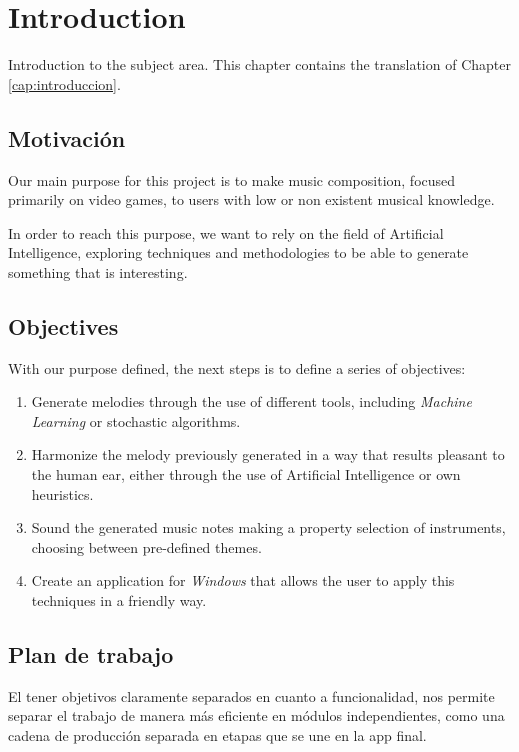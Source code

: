 \chapter*{Introduction}
\label{cap:introduction}

Introduction to the subject area. This chapter contains the translation of Chapter \ref{cap:introduccion}.

\section{Motivación}
Our main purpose for this project is to make music composition, focused primarily on video games, to users with low or non existent musical knowledge.

In order to reach this purpose, we want to rely on the field of Artificial Intelligence, exploring techniques and methodologies to be able to generate something that is interesting.

\section{Objectives}
With our purpose defined, the next steps is to define a series of objectives:
\begin{enumerate}
    \item Generate melodies through the use of different tools, including \textit{Machine Learning} or stochastic algorithms.
    \item Harmonize the melody previously generated in a way that results pleasant to the human ear, either through the use of Artificial Intelligence or own heuristics.
    \item Sound the generated music notes making a property selection of instruments, choosing between pre-defined themes. 
    \item Create an application for \textit{Windows} that allows the user to apply this techniques in a friendly way.
\end{enumerate}

\section{Plan de trabajo}
El tener objetivos claramente separados en cuanto a funcionalidad, nos permite separar el trabajo de manera más eficiente en módulos independientes, como una cadena de producción separada en etapas que se une en la app final. 

